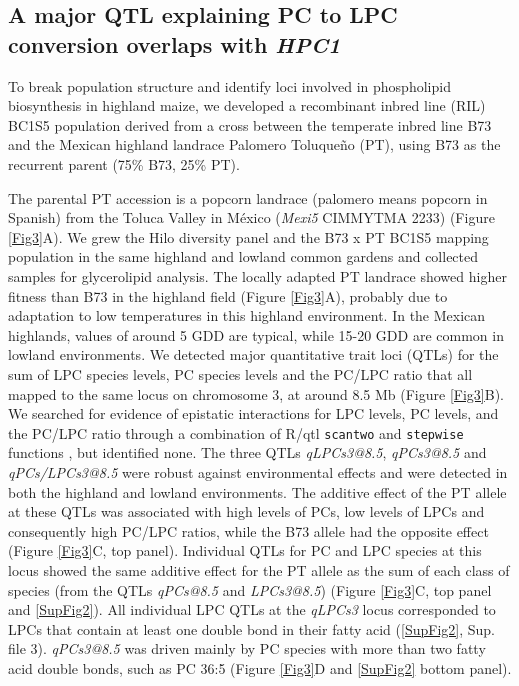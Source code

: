 \documentclass[9pt,twocolumn,twoside,lineno]{biorxiv}
\def\code#1{\texttt{#1}}
\begin{document}
\subsection{A major QTL explaining PC to LPC conversion overlaps with \textit{HPC1}} 
To break population structure and identify loci involved in phospholipid biosynthesis in highland maize, we developed a recombinant inbred line (RIL) BC1S5 population derived from a cross between the temperate inbred line B73 and the Mexican highland landrace Palomero Toluqueño (PT), using B73 as the recurrent parent (75\% B73, 25\% PT). 

The parental PT accession is a popcorn landrace (palomero means popcorn in Spanish) from the Toluca Valley in México (\textit{Mexi5} CIMMYTMA 2233) (Figure \ref{Fig3}A). 
We grew the Hilo diversity panel and the B73 x PT BC1S5 mapping population in the same highland and lowland common gardens and collected samples for glycerolipid analysis.
The locally adapted PT landrace showed higher fitness than B73 in the highland field (Figure \ref{Fig3}A), probably due to adaptation to low temperatures in this highland environment.  
In the Mexican highlands, values of around 5 GDD are typical, while 15-20 GDD are common in lowland environments. 
We detected major quantitative trait loci (QTLs) for the sum of LPC species levels, PC species levels and the PC/LPC ratio that all mapped to the same locus on chromosome 3, at around 8.5 Mb (Figure \ref{Fig3}B). 
We searched for evidence of epistatic interactions for LPC levels, PC levels, and the PC/LPC ratio through a combination of R/qtl \code{scantwo} and \code{stepwise} functions \cite{Broman2003-ac}, but identified none.
The three QTLs \textit{qLPCs3@8.5}, \textit{qPCs3@8.5} and \textit{qPCs/LPCs3@8.5} were robust against environmental effects and were detected in both the highland and lowland environments.
The additive effect of the PT allele at these QTLs was associated with high levels of PCs, low levels of LPCs and consequently high PC/LPC ratios, while the B73 allele had the opposite effect (Figure \ref{Fig3}C, top panel).
Individual QTLs for PC and LPC species at this locus showed the same additive effect for the PT allele as the sum of each class of species (from the QTLs \textit{qPCs@8.5} and \textit{LPCs3@8.5}) (Figure \ref{Fig3}C, top panel and \ref{SupFig2}). 
All individual LPC QTLs at the \textit{qLPCs3} locus corresponded to LPCs that contain at least one double bond in their fatty acid (\ref{SupFig2}, Sup. file 3).
\textit{qPCs3@8.5} was driven mainly by PC species with more than two fatty acid double bonds, such as PC 36:5 (Figure \ref{Fig3}D and \ref{SupFig2} bottom panel).
\end{document}
